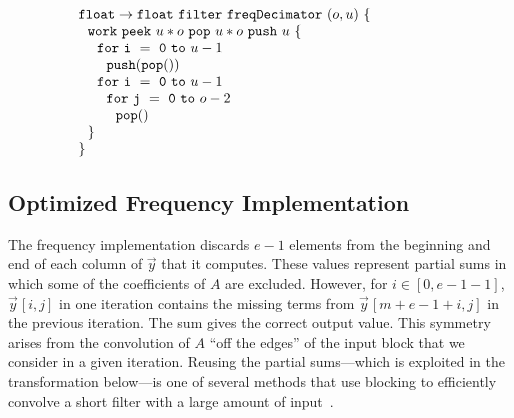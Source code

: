 \begin{transformation}
\begin{equation}
{\begin{array}{ll}
    {\tt float \rightarrow float}~{\tt filter~freqDecimator~}(o, u){\tt ~\{} & \hspace{40pt}\\
    ~~{\tt work~}{\tt peek}~u*o~{\tt pop}~u*o~{\tt push}~u~{\tt \{} \\
    ~~~~{\tt for~i~=~0~to~}u-1 \\
    ~~~~~~{\tt push(pop())} \\
    ~~~~{\tt for~i~=~0~to~}u-1 \\
    ~~~~~~{\tt for~j~=~0~to~}o-2 \\
    ~~~~~~~~{\tt pop()} \\
    ~~{\tt \}} \\
    {\tt \}}
  \end{array}}
\end{equation}
\vspace{-6pt}
\label{trans:freq1}
\end{transformation}

\subsection{Optimized Frequency Implementation}

The {\naive} frequency implementation discards $e-1$ elements from the
beginning and end of each column of ${\vec y}$ that it computes.
These values represent partial sums in which some of the coefficients
of $A$ are excluded. However, for $i \in [0, e-1-1]$, ${\vec
y}\hspace{1pt}[i,j]$ in one iteration contains the missing terms from
${\vec y}\hspace{1pt}[m+e-1+i,j]$ in the previous iteration.  The sum
gives the correct output value.  This symmetry arises from the
convolution of $A$ ``off the edges'' of the input block that we
consider in a given iteration. Reusing the partial sums---which is
exploited in the transformation below---is one of several methods that
use blocking to efficiently convolve a short filter with a large
amount of input~\cite{oppenheim-discrete}.


